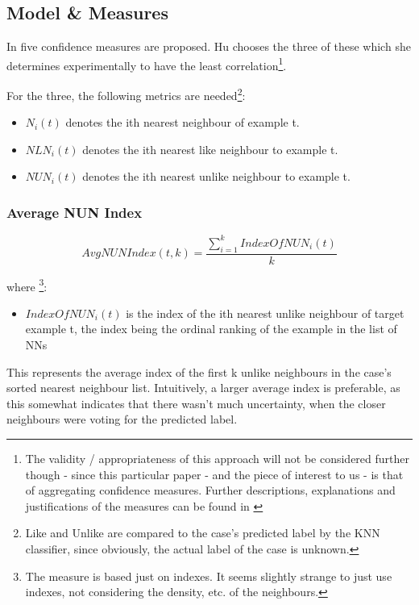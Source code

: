 \documentclass[a4paper,11pt]{report}
\begin{document}
\subsection{Model \& Measures}

In \citet{Delany2005} five confidence measures are proposed. Hu chooses the three of these which she determines experimentally to have the least correlation\footnote{The validity / appropriateness of this approach will not be considered further though - since this particular paper - and the piece of interest to us - is that of aggregating confidence measures. Further descriptions, explanations and justifications of the measures can be found in \citet{Delany2005}}.

For the three, the following metrics are needed\footnote{Like and Unlike are compared to the case's predicted label by the KNN classifier, since obviously, the actual label of the case is unknown.}:
\begin{itemize} 
	\item $N_{i}(t)$ denotes the ith nearest neighbour of example t.
	\item $NLN_{i}(t)$ denotes the ith nearest like neighbour to example t.
	\item $NUN_{i}(t)$ denotes the ith nearest unlike neighbour to example t.
\end{itemize}

\subsubsection{Average NUN Index}

\[
AvgNUNIndex(t,k)=\frac{\sum_{i=1}^{k}IndexOfNUN_{i}(t)}{k}
\]

where \footnote{The measure is based just on indexes. It seems slightly strange to just use indexes, not considering the density, etc. of the neighbours.}:
\begin{itemize}
	\item $IndexOfNUN_{i}(t)$ is the index of the ith nearest unlike neighbour of target example t, the index being the ordinal ranking of the example in the list of NNs
\end{itemize}

This represents the average index of the first k unlike neighbours in the case's sorted nearest neighbour list. Intuitively, a larger average index is preferable, as this somewhat indicates that there wasn't much uncertainty, when the closer neighbours were voting for the predicted label.
\vspace{10pt}
\end{document}
